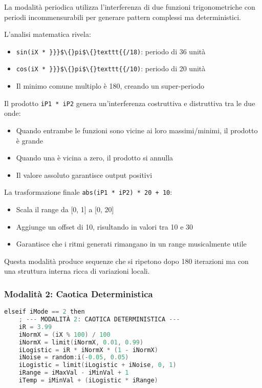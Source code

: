 La modalità periodica utilizza l'interferenza di due funzioni trigonometriche con periodi incommensurabili per generare pattern complessi ma deterministici.

L'analisi matematica rivela:
\begin{itemize}
    \item \texttt{sin(iX * \}\}\}\$\textbackslash\{\}pi\$\textbackslash\{\}texttt\{\{/18)}: periodo di 36 unità
    \item \texttt{cos(iX * \}\}\}\$\textbackslash\{\}pi\$\textbackslash\{\}texttt\{\{/10)}: periodo di 20 unità
    \item Il minimo comune multiplo è 180, creando un super-periodo
\end{itemize}

Il prodotto \texttt{iP1 * iP2} genera un'interferenza costruttiva e distruttiva tra le due onde:
\begin{itemize}
    \item Quando entrambe le funzioni sono vicine ai loro massimi/minimi, il prodotto è grande
    \item Quando una è vicina a zero, il prodotto si annulla
    \item Il valore assoluto garantisce output positivi
\end{itemize}

La trasformazione finale \texttt{abs(iP1 * iP2) * 20 + 10}:
\begin{itemize}
    \item Scala il range da [0, 1] a [0, 20]
    \item Aggiunge un offset di 10, risultando in valori tra 10 e 30
    \item Garantisce che i ritmi generati rimangano in un range musicalmente utile
\end{itemize}

Questa modalità produce sequenze che si ripetono dopo 180 iterazioni ma con una struttura interna ricca di variazioni locali.
\subsubsection{Modalità 2: Caotica Deterministica}
\begin{lstlisting}[language=C]
elseif iMode == 2 then
    ; --- MODALITÀ 2: CAOTICA DETERMINISTICA ---
    iR = 3.99
    iNormX = (iX % 100) / 100
    iNormX = limit(iNormX, 0.01, 0.99)
    iLogistic = iR * iNormX * (1 - iNormX)
    iNoise = random:i(-0.05, 0.05)
    iLogistic = limit(iLogistic + iNoise, 0, 1)
    iRange = iMaxVal - iMinVal + 1
    iTemp = iMinVal + (iLogistic * iRange)
\end{lstlisting}

